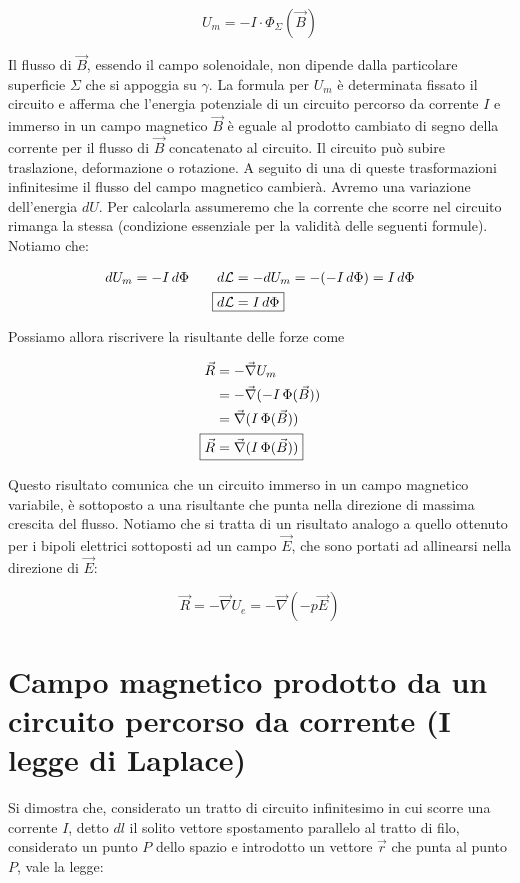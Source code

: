 \[
	\boxed{U_m=-I\cdot \Phi_{\Sigma}(\vec{B})}
\]

Il flusso di $\vec{B}$, essendo il campo solenoidale, non dipende dalla particolare superficie $\Sigma$ che si appoggia su $\gamma$. La formula per $U_m$ è determinata fissato il circuito e afferma che l'energia potenziale di un circuito percorso da corrente $I$ e immerso in un campo magnetico $\vec{B}$ è eguale al prodotto cambiato di segno della corrente per il flusso di $\vec{B}$ concatenato al circuito.
Il circuito può subire traslazione, deformazione o rotazione. A seguito di una di queste trasformazioni infinitesime il flusso del campo magnetico cambierà. Avremo una variazione dell'energia $dU$. Per calcolarla assumeremo che la corrente che scorre nel circuito rimanga la stessa (condizione essenziale per la validità delle seguenti formule). Notiamo che:

\begin{align*}
	dU_m=-I\,d\Phi \qquad d\mathcal{L} &=-dU_m=-(-I\,d\Phi )= I\,d\Phi\\
	\Aboxed{d\mathcal{L} &= I\,d\Phi}
\end{align*}

Possiamo allora riscrivere la risultante delle forze come

\begin{align*}
	\vec{R} &= - \vec{\nabla} U_m \\
	&= -\vec{\nabla} (-I\,\Phi (\vec{B} )) \\
	&= \vec{\nabla}(I\,\Phi (\vec{B} )) \\
	\Aboxed{\vec{R} &= \vec{\nabla}(I\,\Phi (\vec{B} ))}
\end{align*}

Questo risultato comunica che un circuito immerso in un campo magnetico variabile, è sottoposto a una risultante che punta nella direzione di massima crescita del flusso. Notiamo che si tratta di un risultato analogo a quello ottenuto per i bipoli elettrici sottoposti ad un campo $\vec{E}$, che sono portati ad allinearsi nella direzione di $\vec{E}$:

\[
	\vec{R} = - \vec{\nabla} U_e = -\vec{\nabla} (-p\vec{E} )
\]

\section{Campo magnetico prodotto da un circuito percorso da corrente (I legge di Laplace)}

Si dimostra che, considerato un tratto di circuito infinitesimo in cui scorre una corrente $I$, detto $dl$ il solito vettore spostamento parallelo al tratto di filo, considerato un punto $P$ dello spazio e introdotto un vettore $\vec{r}$ che punta al punto $P$, vale la legge:

